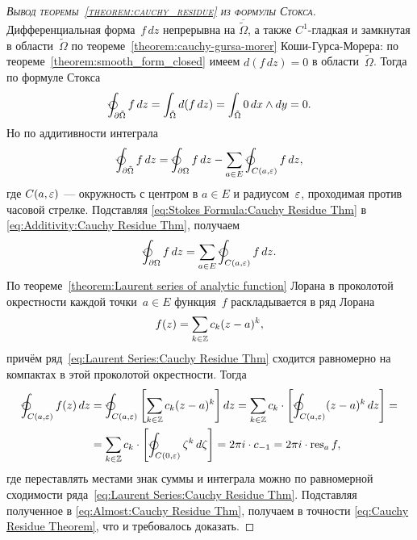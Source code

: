\documentclass[../complex-analysis.tex]{subfiles}
\begin{document}
\begin{proof}[\normalfont\textsc{Вывод теоремы~\ref{theorem:cauchy_residue} из формулы Стокса}]
 Дифференциальная форма~$ f\,dz $ непрерывна на $ \overline{\tilde \Omega} $, а также $ C^{1} $-гладкая и замкнутая в области~$ \tilde \Omega $ по теореме~\ref{theorem:cauchy-gursa-morer} Коши-Гурса-Морера: по теореме~\ref{theorem:smooth_form_closed} имеем $ d(f\,dz) = 0 $ в области~$ \tilde\Omega $. Тогда по формуле Стокса
 \begin{align}
  \label{eq:Stokes Formula:Cauchy Residue Thm}
  \varointctrclockwise_{\partial \tilde \Omega}   f\,dz = \int_{\tilde \Omega} d(f\,dz)  = \int_{\tilde\Omega} 0\,dx\land dy = 0.
 \end{align} Но по аддитивности интеграла
 \begin{align}
  \label{eq:Additivity:Cauchy Residue Thm}
  \varointctrclockwise_{\partial \tilde \Omega} f\,dz = \varointctrclockwise_{\partial \Omega} f\,dz - \sum_{a \in E} \varointctrclockwise_{C(a,\eps)}f\,dz,
 \end{align} где $ C(a,\varepsilon) $ --- окружность с центром в $ a \in E $ и радиусом~$ \varepsilon $, проходимая против часовой стрелке. Подставляя \eqref{eq:Stokes Formula:Cauchy Residue Thm} в \eqref{eq:Additivity:Cauchy Residue Thm}, получаем
 \begin{align}
  \label{eq:Almost:Cauchy Residue Thm}
  \varointctrclockwise_{\partial\Omega} f\,dz = \sum_{a \in E}\varointctrclockwise_{C(a,\eps)} f\,dz.
 \end{align} По теореме~\ref{theorem:Laurent series of analytic function} Лорана в проколотой окрестности каждой точки~$ a \in E $ функция~$ f $ раскладывается в ряд Лорана
 \begin{align}
  \label{eq:Laurent Series:Cauchy Residue Thm}
  f(z)=\sum_{k\in\mathbb{Z}}c_k(z-a)^{k},
 \end{align} причём ряд~\eqref{eq:Laurent Series:Cauchy Residue Thm} сходится равномерно на компактах в этой проколотой окрестности. Тогда
 \begin{align*}
  \varointctrclockwise_{C(a,\eps)}f(z)\,dz &= \varointctrclockwise_{C(a,\eps)} \left[ \sum_{k \in \Z} c_k(z-a)^{k} \right]dz = \sum_{k\in\Z} c_k \cdot \left[ \varointctrclockwise_{C(a,\eps)} (z-a)^{k}\,dz \right] = \\
  &= \sum_{k\in\Z}c_k \cdot \left[ \varointctrclockwise_{C(0,\eps)} \zeta^{k}\,d\zeta \right] = 2\pi i \cdot c_{-1} = 2\pi i \cdot \residue_a f,
 \end{align*} где переставлять местами знак суммы и интеграла можно по равномерной сходимости ряда~\eqref{eq:Laurent Series:Cauchy Residue Thm}. Подставляя полученное в \eqref{eq:Almost:Cauchy Residue Thm}, получаем в точности \eqref{eq:Cauchy Residue Theorem}, что и требовалось доказать.
\end{proof}
\end{document}
